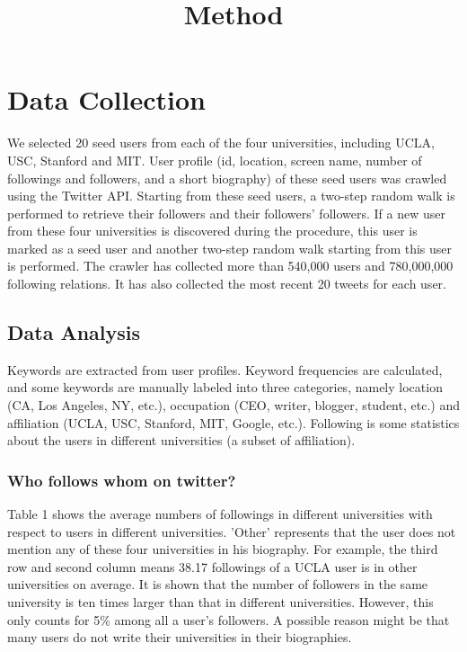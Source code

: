 \documentclass{article}
\begin{document}
\title{Method}
\maketitle \else \fi

\section{Data Collection}\label{sec:datacollection}
We selected 20 seed users from each of the four universities, including UCLA, USC, Stanford and MIT. User profile (id, location, screen name, number of followings and followers, and a short biography) of these seed users was crawled using the Twitter API. Starting from these seed users, a two-step random walk is performed to retrieve their followers and their followers' followers. If a new user from these four universities is discovered during the procedure, this user is marked as a seed user and another two-step random walk starting from this user is performed. The crawler has collected more than 540,000 users and 780,000,000 following relations. It has also collected the most recent 20 tweets for each user.

\subsection{Data Analysis}
Keywords are extracted from user profiles. Keyword frequencies are calculated, and some keywords are manually labeled into three categories, namely location (CA, Los Angeles, NY, etc.), occupation (CEO, writer, blogger, student, etc.) and affiliation (UCLA, USC, Stanford, MIT, Google, etc.). Following is some statistics about the users in different universities (a subset of affiliation).

\subsubsection{Who follows whom on twitter?}
Table 1 shows the average numbers of followings in different universities with respect to users in different universities. 'Other' represents that the user does not mention any of these four universities in his biography. For example, the third row and second column means 38.17 followings of a UCLA user is in other universities on average. It is shown that the number of followers in the same university is ten times larger than that in different universities. However, this only counts for 5\% among all a user's followers. A possible reason might be that many users do not write their universities in their biographies.
\end{document}
